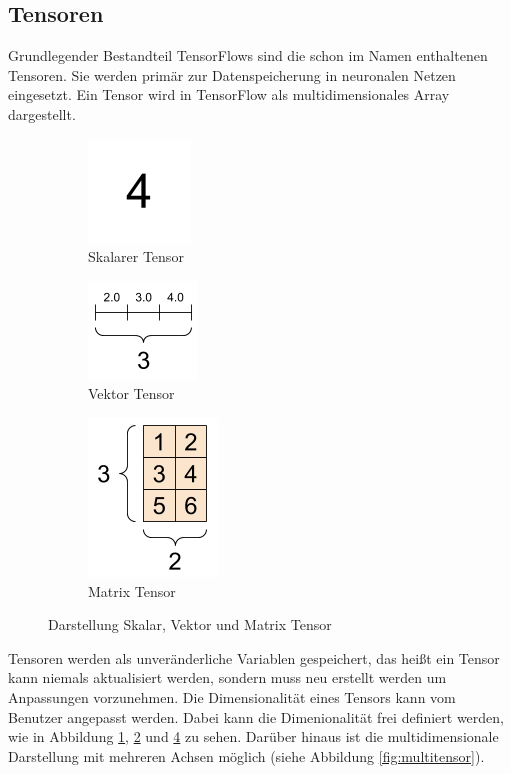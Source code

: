 \subsection{Tensoren}
Grundlegender Bestandteil TensorFlows sind die schon im Namen enthaltenen Tensoren. Sie werden primär zur Datenspeicherung in neuronalen Netzen eingesetzt. Ein Tensor wird in TensorFlow als multidimensionales Array dargestellt. 

\begin{figure}[htb]
	\begin{subfigure}[ht]{0.33\textwidth}
		\includegraphics{images/scalar}
		\caption{Skalarer Tensor \cite{tf_tensor}}
		\label{fig:scalartensor}
	\end{subfigure}\hfill%
	\begin{subfigure}[ht]{0.33\textwidth}
		\includegraphics{images/vector}
		\caption{Vektor Tensor \cite{tf_tensor}}
		\label{fig:vectortensor}
	\end{subfigure}\hfill%
	\begin{subfigure}[ht]{0.33\textwidth}
		\includegraphics{images/matrix}
		\caption{Matrix Tensor \cite{tf_tensor}}
		\label{fig:matrixtensor}
	\end{subfigure}\hfill%
	\caption{Darstellung Skalar, Vektor und Matrix Tensor}
\end{figure}

Tensoren werden als unveränderliche Variablen gespeichert, das heißt ein Tensor kann niemals aktualisiert werden, sondern muss neu erstellt werden um Anpassungen vorzunehmen. Die Dimensionalität eines Tensors kann vom Benutzer angepasst werden. Dabei kann die Dimenionalität frei definiert werden, wie in Abbildung \ref{fig:scalartensor}, \ref{fig:vectortensor} und \ref{fig:matrixtensor} zu sehen. Darüber hinaus ist die multidimensionale Darstellung mit mehreren Achsen möglich (siehe Abbildung \ref{fig:multitensor}).

